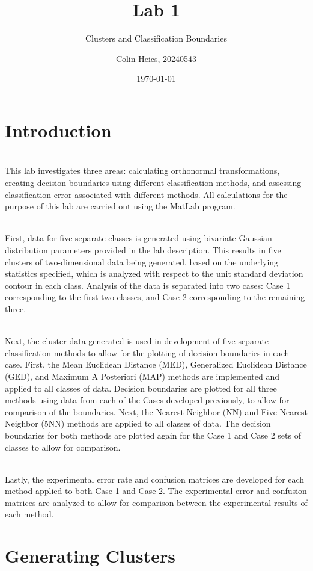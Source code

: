 \documentclass[article, 1.5space, letterpaper, 12pt, oneside, header, footer]{SydeClass}
\title{Lab 1}
\subtitle{Clusters and Classification Boundaries}
\author{Colin Heics, 20240543}
\date{\today}
\begin{document}



\section{Introduction}
\\This lab investigates three areas: calculating orthonormal transformations, creating decision boundaries using different classification methods, and assessing classification error associated with different methods. All calculations for the purpose of this lab are carried out using the MatLab program.

\\First, data for five separate classes is generated using bivariate Gaussian distribution parameters provided in the lab description. This results in five clusters of two-dimensional data being generated, based on the underlying statistics specified, which is analyzed with respect to the unit standard deviation contour in each class. Analysis of the data is separated into two cases: Case 1 corresponding to the first two classes, and Case 2 corresponding to the remaining three.

\\Next, the cluster data generated is used in development of five separate classification methods to allow for the plotting of decision boundaries in each case. First, the Mean Euclidean Distance (MED), Generalized Euclidean Distance (GED), and Maximum A Posteriori (MAP) methods are implemented and applied to all classes of data. Decision boundaries are plotted for all three methods using data from each of the Cases developed previously, to allow for comparison of the boundaries. Next, the Nearest Neighbor (NN) and Five Nearest Neighbor (5NN) methods are applied to all classes of data. The decision boundaries for both methods are plotted again for the Case 1 and Case 2 sets of classes to allow for comparison.

\\Lastly, the experimental error rate and confusion matrices are developed for each method applied to both Case 1 and Case 2. The experimental error and confusion matrices are analyzed to allow for comparison between the experimental results of each method.

\section{Generating Clusters}
\end{document}
